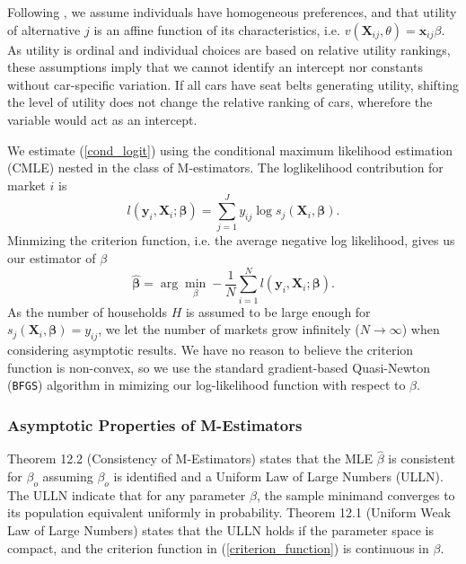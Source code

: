 \documentclass[11pt]{article}
\begin{document}
Following \cite{project3_ABF_SJH}, we assume individuals have homogeneous preferences, and that utility of alternative $j$ is an affine function of its characteristics, i.e. $v(\textbf{X}_{ij},\theta)=\textbf{x}_{ij}\beta$. 
As utility is ordinal and individual choices are based on relative utility rankings, these assumptions imply that we cannot identify an intercept nor constants without car-specific variation. If all cars have seat belts generating utility, shifting the level of utility does not change the relative ranking of cars, wherefore the variable would act as an intercept. 

We estimate (\ref{cond_logit}) using the conditional maximum likelihood estimation (CMLE) nested in the class of M-estimators. 
The loglikelihood contribution for market $i$ is 
\begin{equation}
    l(\mathbf{y}_i,\mathbf{X}_i;\boldsymbol{\beta})=\sum_{j=1}^J y_{ij} \log s_j(\mathbf{X}_i,\boldsymbol{\beta}).
\end{equation}
Minmizing the criterion function, i.e. the average negative log likelihood, gives us our estimator of $\beta$
\begin{equation}
\label{criterion_function}
    \widehat{\mathbf{\beta}}=\arg \min_\beta -\frac{1}{N}\sum_{i=1}^Nl(\mathbf{y}_i,\mathbf{X}_i;\boldsymbol{\beta}).
\end{equation}
As the number of households $H$ is assumed to be large enough for $s_j(\mathbf{X}_i,\boldsymbol{\beta})=y_{ij}$, we let the number of markets grow infinitely ($N\rightarrow\infty$) when considering asymptotic results. We have no reason to believe the criterion function is non-convex, so we use the standard gradient-based Quasi-Newton (\texttt{BFGS}) algorithm in mimizing our log-likelihood function with respect to $\beta$. 

\subsubsection{Asymptotic Properties of M-Estimators}

Theorem 12.2 (Consistency of M-Estimators) states that the MLE $\widehat{\beta}$ is consistent for $\beta_o$ assuming $\beta_o$ is identified and a Uniform Law of Large Numbers (ULLN).   
The ULLN indicate that for any parameter $\beta$, the sample minimand converges to its population equivalent uniformly in probability. Theorem 12.1 (Uniform Weak Law of Large Numbers) states that the ULLN holds if the parameter space is compact, and the criterion function in (\ref{criterion_function}) is continuous in $\beta$.
\end{document}
